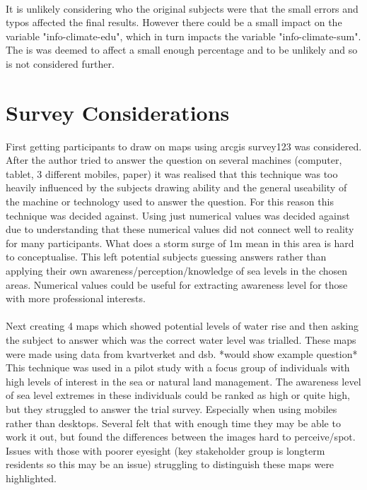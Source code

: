\paragraph{}
It is unlikely considering who the original subjects were that the small errors and typos affected the final results. However there could be a small impact on the variable "info-climate-edu", which in turn impacts the variable "info-climate-sum". The is was deemed to affect a small enough percentage and to be unlikely and so is not considered further.



\section{Survey Considerations}

First getting participants to draw on maps using arcgis survey123 was considered. After the author tried to answer the question on several machines (computer, tablet, 3 different mobiles, paper) it was realised that this technique was too heavily influenced by the subjects drawing ability and the general useability of the machine or technology used to answer the question. For this reason this technique was decided against.
Using just numerical values was decided against due to understanding that these numerical values did not connect well to reality for many participants. What does a storm surge of 1m mean in this area is hard to conceptualise. This left potential subjects guessing answers rather than applying their own awareness/perception/knowledge of sea levels in the chosen areas. Numerical values could be useful for extracting awareness level for those with more professional interests.
\paragraph{}

Next creating 4 maps which showed potential levels of water rise and then asking the subject to answer which was the correct water level was trialled. These maps were made using data from kvartverket and dsb. *would show example question*
This technique was used in a pilot study with a focus group of individuals with high levels of interest in the sea or natural land management. The awareness level of sea level extremes in these individuals could be ranked as high or quite high, but they struggled to answer the trial survey. Especially when using mobiles rather than desktops. Several felt that with enough time they may be able to work it out, but found the differences between the images hard to perceive/spot. Issues with those with poorer eyesight (key stakeholder group is longterm residents so this may be an issue) struggling to distinguish these maps were highlighted.
